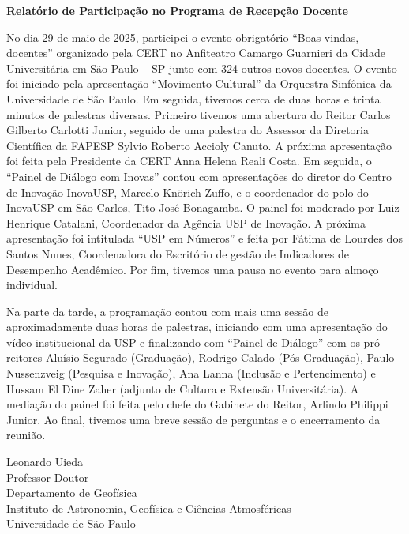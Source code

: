 \documentclass[a4paper,onecolumn,10pt]{article}
\newcommand{\Titulo}{Relatório de Participação no Programa de Recepção Docente}
\newcommand{\Nome}{Leonardo Uieda}
\newcommand{\Cargo}{Professor Doutor}
\newcommand{\Padding}{\vspace{0.5cm}}
\begin{document}
\noindent\textbf{\large \Titulo}
\Padding

No dia 29 de maio de 2025, participei o evento obrigatório ``Boas-vindas,
docentes'' organizado pela CERT no Anfiteatro Camargo Guarnieri da Cidade
Universitária em São Paulo -- SP junto com 324 outros novos docentes.
O evento foi iniciado pela apresentação ``Movimento Cultural'' da Orquestra
Sinfônica da Universidade de São Paulo.
Em seguida, tivemos cerca de duas horas e trinta minutos de palestras diversas.
Primeiro tivemos uma abertura do Reitor Carlos Gilberto Carlotti Junior,
seguido de uma palestra do Assessor da Diretoria Científica da FAPESP Sylvio
Roberto Accioly Canuto.
A próxima apresentação foi feita pela Presidente da CERT Anna Helena Reali
Costa.
Em seguida, o ``Painel de Diálogo com Inovas'' contou com apresentações do
diretor do Centro de Inovação InovaUSP, Marcelo Knörich Zuffo, e o coordenador
do polo do InovaUSP em São Carlos, Tito José Bonagamba.
O painel foi moderado por Luiz Henrique Catalani, Coordenador da Agência
USP de Inovação.
A próxima apresentação foi intitulada ``USP em Números'' e feita por Fátima de
Lourdes dos Santos Nunes, Coordenadora do Escritório de gestão de Indicadores
de Desempenho Acadêmico.
Por fim, tivemos uma pausa no evento para almoço individual.

Na parte da tarde, a programação contou com mais uma sessão de aproximadamente
duas horas de palestras, iniciando com uma apresentação do vídeo
institucional da USP e finalizando com
``Painel de Diálogo'' com os pró-reitores Aluísio Segurado (Graduação), Rodrigo
Calado (Pós-Graduação), Paulo Nussenzveig (Pesquisa e Inovação), Ana Lanna
(Inclusão e Pertencimento) e Hussam El Dine Zaher (adjunto de Cultura
e Extensão Universitária).
A mediação do painel foi feita pelo chefe do Gabinete do Reitor,
Arlindo Philippi Junior.
Ao final, tivemos uma breve sessão de perguntas e o encerramento da reunião.


\Padding
\noindent\Nome{}
\\[0.25cm]
{
\color{mediumgray}
\small
\Cargo
\\
Departamento de Geofísica
\\
Instituto de Astronomia, Geofísica e Ciências Atmosféricas
\\
Universidade de São Paulo
}
\end{document}
